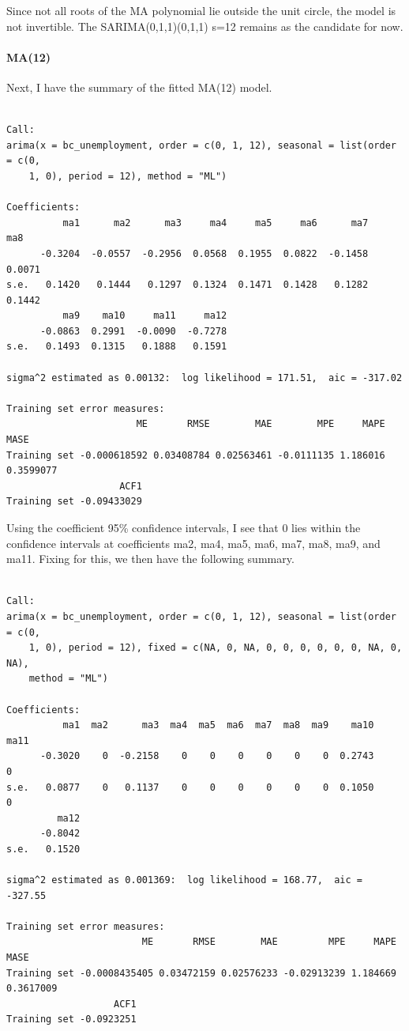 \documentclass[
  letterpaper,
  DIV=11,
  numbers=noendperiod]{scrartcl}
\let\oldparagraph\paragraph
\renewcommand{\paragraph}[1]{\oldparagraph{#1}\mbox{}}
\begin{document}
Since not all roots of the MA polynomial lie outside the unit circle,
the model is not invertible. The SARIMA(0,1,1)(0,1,1) s=12 remains as
the candidate for now.

\hypertarget{ma12}{%
\paragraph{MA(12)}\label{ma12}}

Next, I have the summary of the fitted MA(12) model.

\begin{verbatim}

Call:
arima(x = bc_unemployment, order = c(0, 1, 12), seasonal = list(order = c(0, 
    1, 0), period = 12), method = "ML")

Coefficients:
          ma1      ma2      ma3     ma4     ma5     ma6      ma7     ma8
      -0.3204  -0.0557  -0.2956  0.0568  0.1955  0.0822  -0.1458  0.0071
s.e.   0.1420   0.1444   0.1297  0.1324  0.1471  0.1428   0.1282  0.1442
          ma9    ma10     ma11     ma12
      -0.0863  0.2991  -0.0090  -0.7278
s.e.   0.1493  0.1315   0.1888   0.1591

sigma^2 estimated as 0.00132:  log likelihood = 171.51,  aic = -317.02

Training set error measures:
                       ME       RMSE        MAE        MPE     MAPE      MASE
Training set -0.000618592 0.03408784 0.02563461 -0.0111135 1.186016 0.3599077
                    ACF1
Training set -0.09433029
\end{verbatim}

Using the coefficient 95\% confidence intervals, I see that 0 lies
within the confidence intervals at coefficients ma2, ma4, ma5, ma6, ma7,
ma8, ma9, and ma11. Fixing for this, we then have the following summary.

\begin{verbatim}

Call:
arima(x = bc_unemployment, order = c(0, 1, 12), seasonal = list(order = c(0, 
    1, 0), period = 12), fixed = c(NA, 0, NA, 0, 0, 0, 0, 0, 0, NA, 0, NA), 
    method = "ML")

Coefficients:
          ma1  ma2      ma3  ma4  ma5  ma6  ma7  ma8  ma9    ma10  ma11
      -0.3020    0  -0.2158    0    0    0    0    0    0  0.2743     0
s.e.   0.0877    0   0.1137    0    0    0    0    0    0  0.1050     0
         ma12
      -0.8042
s.e.   0.1520

sigma^2 estimated as 0.001369:  log likelihood = 168.77,  aic = -327.55

Training set error measures:
                        ME       RMSE        MAE         MPE     MAPE      MASE
Training set -0.0008435405 0.03472159 0.02576233 -0.02913239 1.184669 0.3617009
                   ACF1
Training set -0.0923251
\end{verbatim}
\end{document}
